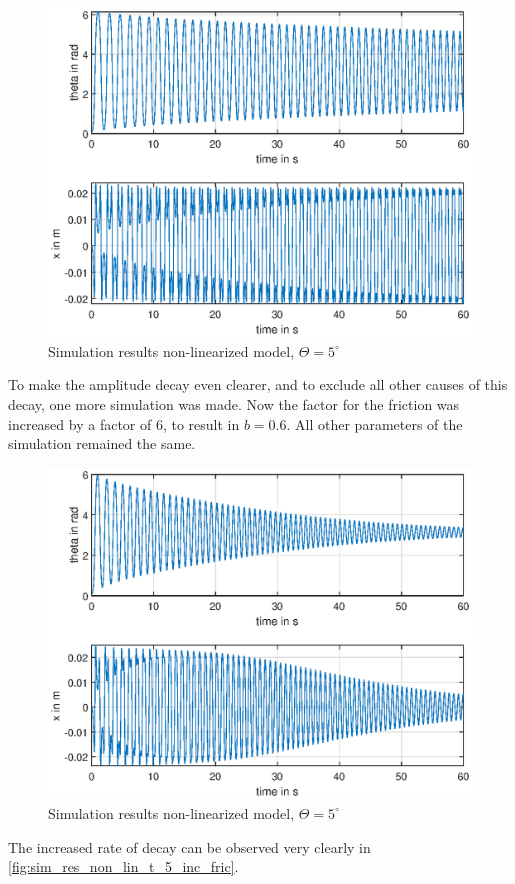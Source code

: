 \begin{figure}[H]
    \centering
    \includegraphics{Lab_report/pics/plots/non_linearized_results_theta_5.eps}
    \caption{Simulation results non-linearized model, $\Theta=5^\circ$}
    \label{fig:sim_res_non_lin_t_5}
\end{figure}
To make the amplitude decay even clearer, and to exclude all other causes of this decay, one more simulation was made. Now the factor for the friction was increased by a factor of 6, to result in $b=0.6$. All other parameters of the simulation remained the same. 
\begin{figure}[H]
    \centering
    \includegraphics{Lab_report/pics/plots/non_linearized_results_inc_friction.eps}
    \caption{Simulation results non-linearized model, $\Theta=5^\circ$}
    \label{fig:sim_res_non_lin_t_5_inc_fric}
\end{figure}
The increased rate of decay can be observed very clearly in \autoref{fig:sim_res_non_lin_t_5_inc_fric}.
